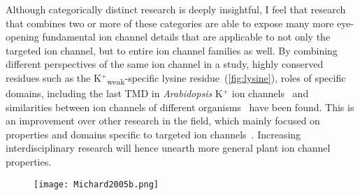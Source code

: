 \documentclass[11pt]{article}
\begin{document}
\begin{multicols*}{2}
Although categorically distinct research is deeply insightful, I feel that research that combines two or more of these categories are able to expose many more eye-opening fundamental ion channel details that are applicable to not only the targeted ion channel, but to entire ion channel families as well. By combining different perspectives of the same ion channel in a study, highly conserved residues such as the K$^{+}$\textsubscript{weak}-specific lysine residue~(\autoref{fig:lysine})\citep{Michard2005b}, roles of specific domains, including the last TMD in \textit{Arabidopsis} K$^{+}$ ion channels~\citep{Gajdanowicz2009} and similarities between ion channels of different organisms~\citep{Cellier2004} have been found. This is an improvement over other research in the field, which mainly focused on properties and domains specific to targeted ion channels~\citep{Becker2003,Li2008,Liu2006}. Increasing interdisciplinary research will hence unearth more general plant ion channel properties.

\begin{figure}[H]
  \centering
    \texttt{[image: Michard2005b.png]}
  \label{fig:lysine}
\end{figure}


\end{multicols*}
\end{document}
